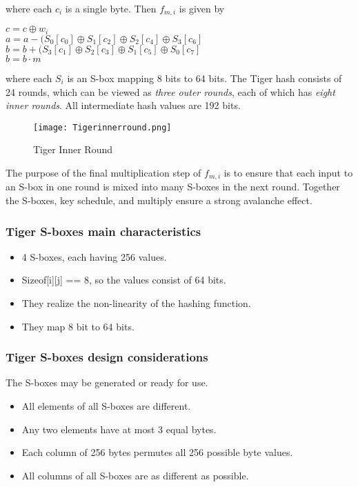 \documentclass[a4paper]{article}
\begin{document}
where each $c_i$ is a single byte. Then $f_{m,i}$ is given by
\begin{center}
    $c = c \oplus w_i$\\
    $a = a - (S_0[c_0] \oplus S_1[c_2] \oplus S_2[c_4] \oplus S_3[c_6]$\\
    $b = b + (S_3[c_1] \oplus S_2[c_3] \oplus S_1[c_5] \oplus S_0[c_7]$\\
    $b = b \cdot m$
\end{center}
where each $S_i$ is an S-box mapping 8 bits to 64 bits. The Tiger hash consists of 24 rounds, which can be viewed as\textit{ three outer rounds}, each of which has \textit{eight inner rounds}. All intermediate hash values are 192 bits.
\begin{figure}[H]
    \centering
    \texttt{[image: Tigerinnerround.png]}
    \caption{Tiger Inner Round}
\end{figure}
The purpose of the final multiplication step of $f_{m,i}$ is to ensure that each input to an S-box in one round is mixed into many S-boxes in the next round. Together the S-boxes, key schedule, and multiply ensure a strong avalanche effect.
\newpage
\subsubsection{Tiger S-boxes main characteristics}
\begin{itemize}
    \item 4 S-boxes, each having 256 values.
    \item Sizeof[i][j] == 8, so the values consist of 64 bits.
    \item They realize the non-linearity of the hashing function.
    \item They map 8 bit to 64 bits.
\end{itemize}{}

\subsubsection{Tiger S-boxes design considerations}
The S-boxes may be generated or ready for use.
\begin{itemize}
    \item All elements of all S-boxes are different.
    \item Any two elements have at most 3 equal bytes.
    \item Each column of 256 bytes permutes all 256 possible byte values.
    \item All columns of all S-boxes are as different as possible.
\end{itemize}{}
\end{document}
